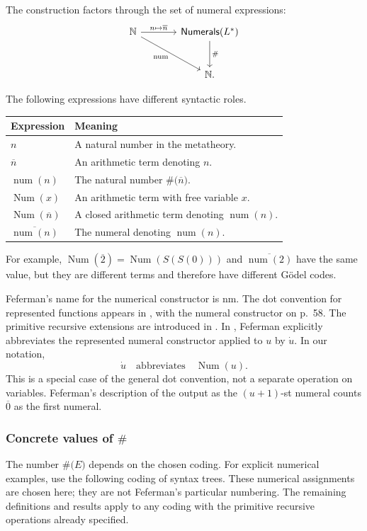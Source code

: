 \documentclass[11pt]{article}
\newcommand{\N}{\mathbb N}
\newcommand{\num}{\operatorname{num}}
\newcommand{\Num}{\operatorname{Num}}
\newcommand{\code}[1]{\#\bigl(#1\bigr)}
\newcommand{\bn}[1]{\overline{#1}}
\theoremstyle{definition}
\begin{document}
The construction factors through the set of numeral expressions:
\[
\begin{tikzcd}[column sep=large,row sep=large]
 \N \arrow[r,"n\mapsto\bn n"] \arrow[dr,"\num"'] &
 \mathsf{Numerals}(L^{*}) \arrow[d,"\#"]\\
 & \N.
\end{tikzcd}
\]

\noindent The following expressions have different syntactic roles.
\begin{center}
\renewcommand{\arraystretch}{1.18}
\begin{tabularx}{\linewidth}{@{}lX@{}}
\toprule
Expression & Meaning\\
\midrule
$n$ & A natural number in the metatheory.\\
$\bn n$ & An arithmetic term denoting $n$.\\
$\num(n)$ & The natural number $\code{\bn n}$.\\
$\Num(x)$ & An arithmetic term with free variable $x$.\\
$\Num(\bn n)$ & A closed arithmetic term denoting $\num(n)$.\\
$\bn{\num(n)}$ & The numeral denoting $\num(n)$.\\
\bottomrule
\end{tabularx}
\end{center}
For example, $\Num(\bn2)=\Num(S(S(0)))$ and
$\bn{\num(2)}$ have the same value, but they are different terms and
therefore have different G\"odel codes.

Feferman's name for the numerical constructor is $\mathrm{nm}$.
The dot convention for represented functions appears in
\cite[\S4, p.~57]{F60}, with the numeral constructor on p.~58.
The primitive recursive extensions are introduced in
\cite[\S3, Definition~3.3 and Theorem~3.4, pp.~52--53]{F60}.
In \cite[\S2(c), p.~269]{F62}, Feferman explicitly abbreviates the
represented numeral constructor applied to $u$ by $\dot u$.
In our notation,
\begin{equation}\label{eq:dot}
  \dot u\quad\text{abbreviates}\quad\Num(u).
\end{equation}
This is a special case of the general dot convention, not a separate
operation on variables. Feferman's description of the output as the
$(u+1)$-st numeral counts $\bn0$ as the first numeral.

\subsubsection*{Concrete values of \texorpdfstring{$\#$}{the coding map}}
The number $\code E$ depends on the chosen coding. For explicit numerical
examples, use the following coding of syntax trees. These numerical
assignments are chosen here; they are not Feferman's particular numbering.
The remaining definitions and results apply to any coding with the
primitive recursive operations already specified.
\end{document}
